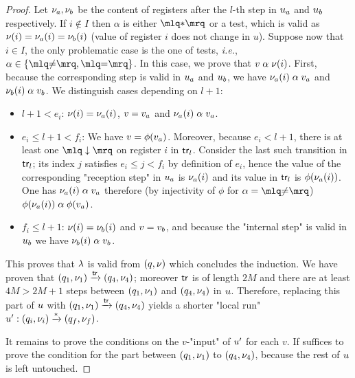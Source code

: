 \begin{proof}
	Let $\nu_a, \nu_b$ be the content of registers after the $l$-th step in $u_a$ and $u_b$ respectively. 
	 If $i \notin I$ then $\alpha$ is either $\quotemarks{\dummyact}$ or a test, which is valid as  $\nu(i) = \nu_a(i) = \nu_b(i)$ (value of register $i$ does not change in $u$).	
	Suppose now that $i \in I$, the only problematic case is the one of tests, \emph{i.e.}, $\anact \in \set{\quotemarks{\diseqtestact},\quotemarks{\eqtestact}}$. 
	In this case, we prove that $v \mathrel{\alpha} \nu(i)$. First, because the corresponding step is valid in $u_a$ and $u_b$, we have $\nu_a(i) \mathrel{\alpha} v_a$ and $\nu_b(i) \mathrel{\alpha} v_b$. We distinguish cases depending on $l+1$:
	\begin{itemize}
		\item $l+1<e_i$: $\nu(i)= \nu_a(i)$, $v = v_a$ and $\nu_a(i) \mathrel{\alpha} v_a$. 
		\item $e_i \leq l+1 < f_i$: We have $v = \phi(v_a)$. 
		Moreover, because $e_i < l+1$, there is at least one $\quotemarks{\enregact}$ on register $i$ in $\mathsf{tr}_l$. Consider the last such transition in $\mathsf{tr}_l$; its index $j$ satisfies $e_i \leq j < f_i$ by definition of $e_i$, hence the value of the corresponding "reception step" in $u_a$ is $\nu_a(i)$ and its value in $\mathsf{tr}_{l}$ is $\phi(\nu_a(i))$. One has $\nu_a(i) \mathrel{\alpha} v_a$ therefore (by injectivity of $\phi$ for $\anact = \quotemarks{\diseqtestact}$)
		$\phi(\nu_a(i)) \mathrel{\alpha} \phi(v_a)$.
		\item$f_i \leq l+1$: $\nu(i)= \nu_b(i)$ and $v = v_b$, and because the "internal step" is valid in $u_b$ we have $\nu_b(i) \mathrel{\alpha} v_b$. 
	\end{itemize}
	
	This proves that $\lambda$ is valid from $(q,\nu)$ which concludes the induction. 
	We have proven that $(q_1,\nu_1) \xrightarrow{\mathsf{tr}} (q_4, \nu_4)$; moreover $\mathsf{tr}$ is of length $2M$ and there are at least $4M>2M+1$ steps between $(q_1,\nu_1)$ and $(q_4, \nu_4)$ in $u$. Therefore, replacing this part of $u$ with $(q_1,\nu_1) \xrightarrow{\mathsf{tr}} (q_4, \nu_4)$ yields a shorter "local run" $u': (q_i, \nu_i) \xrightarrow{*} (q_f,\nu_f)$. 
	
	It remains to prove the conditions on the $v$-"input" of $u'$ for each $v$. If suffices to prove the condition for the part between $(q_1, \nu_1)$ to $(q_4, \nu_4)$,
	because the rest of $u$ is left untouched. 
	

\end{proof}

